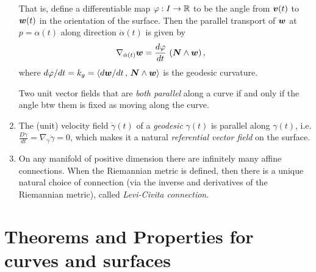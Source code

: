 \documentclass[11pt]{article}
\begin{document}
\begin{enumerate}
That is, define a differentiable map $\varphi: I \rightarrow {\mathbb R}$ to be the angle from $\boldsymbol{v}(t)$ to $\boldsymbol{w}(t)$ in the orientation of the surface. Then the parallel transport of $\boldsymbol{w}$ at $p=\alpha(t)$ along direction $\dot{\alpha}(t)$ is given by 
\begin{align*}
\nabla_{\dot{\alpha}(t)}\boldsymbol{w} &= \frac{d\varphi}{dt}\,\left(\boldsymbol{N}\wedge \boldsymbol{w}\right),
\end{align*}
where $d\varphi/dt = k_{g} = \left\langle d\boldsymbol{w}/dt\,,\, \boldsymbol{N}\wedge \boldsymbol{w} \right\rangle$ is the geodesic curvature. 

Two unit vector fields that are \emph{both parallel} along a curve if and only if the angle btw them is fixed as moving along the curve.\\



 
\item The (unit) velocity field $\dot{\gamma}(t)$ of a \emph{geodesic} $\gamma(t)$ is parallel along $\gamma(t)$, i.e. $\frac{D\dot{\gamma}}{dt} = \nabla_{\dot{\gamma}}\dot{\gamma} = 0$, which makes it a natural \emph{referential vector field} on the surface.\\[5pt]

\item On any manifold of positive dimension there are infinitely many affine connections. When the Riemannian metric is defined, then there is a unique natural choice of connection (via the inverse and derivatives of the Riemannian metric), called \emph{Levi-Civita connection}.
\end{enumerate}
\newpage
\section{Theorems and Properties for curves and surfaces}
\end{document}
